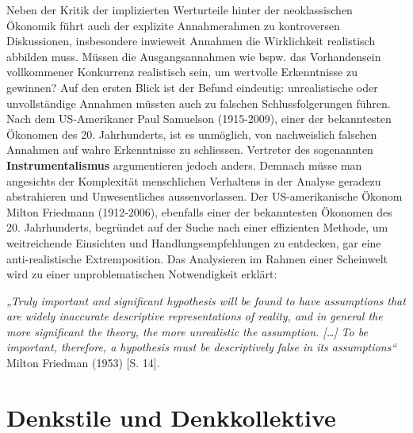 \documentclass[
  nswissgerman,
  a4paper,
  DIV=11,
  numbers=noendperiod,
  oneside,
  openany]{scrreprt}
\begin{document}
\begin{tcolorbox}[enhanced jigsaw, arc=.35mm, bottomrule=.15mm, bottomtitle=1mm, breakable, colback=white, colbacktitle=quarto-callout-tip-color!10!white, colframe=quarto-callout-tip-color-frame, coltitle=black, left=2mm, leftrule=.75mm, opacityback=0, opacitybacktitle=0.6, rightrule=.15mm, title={Exkurs: Müssen Annahmen realistisch sein?}, titlerule=0mm, toprule=.15mm, toptitle=1mm]

Neben der Kritik der implizierten Werturteile hinter der neoklassischen
Ökonomik führt auch der explizite Annahmerahmen zu kontroversen
Diskussionen, insbesondere inwieweit Annahmen die Wirklichkeit
realistisch abbilden muss. Müssen die Ausgangsannahmen wie bspw. das
Vorhandensein vollkommener Konkurrenz realistisch sein, um wertvolle
Erkenntnisse zu gewinnen? Auf den ersten Blick ist der Befund eindeutig:
unrealistische oder unvollständige Annahmen müssten auch zu falschen
Schlussfolgerungen führen. Nach dem US-Amerikaner Paul Samuelson
(1915-2009), einer der bekanntesten Ökonomen des 20. Jahrhunderts, ist
es unmöglich, von nachweislich falschen Annahmen auf wahre Erkenntnisse
zu schliessen. Vertreter des sogenannten \textbf{Instrumentalismus}
argumentieren jedoch anders. Demnach müsse man angesichts der
Komplexität menschlichen Verhaltens in der Analyse geradezu abstrahieren
und Unwesentliches aussenvorlassen. Der US-amerikanische Ökonom Milton
Friedmann (1912-2006), ebenfalls einer der bekanntesten Ökonomen des 20.
Jahrhunderts, begründet auf der Suche nach einer effizienten Methode, um
weitreichende Einsichten und Handlungsempfehlungen zu entdecken, gar
eine anti-realistische Extremposition. Das Analysieren im Rahmen einer
Scheinwelt wird zu einer unproblematischen Notwendigkeit erklärt:

\emph{„Truly important and significant hypothesis will be found to have
assumptions that are widely inaccurate descriptive representations of
reality, and in general the more significant the theory, the more
unrealistic the assumption. {[}\ldots{]} To be important, therefore, a
hypothesis must be descriptively false in its assumptions``} Milton
Friedman (1953) {[}S. 14{]}.

\end{tcolorbox}

\section{Denkstile und
Denkkollektive}\label{denkstile-und-denkkollektive}
\end{document}
